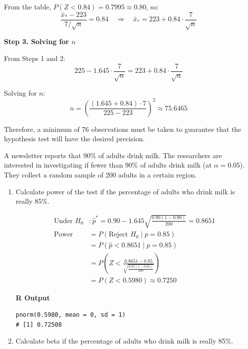 \begin{example}
From the table, $P(Z < 0.84) = 0.7995 \approx 0.80$, so:
\[
\frac{\bar{x}_* - 223}{7 / \sqrt{n}} = 0.84
\quad \Rightarrow \quad
\bar{x}_* = 223 + 0.84 \cdot \frac{7}{\sqrt{n}}
\]

\vspace{1em}
\textbf{Step 3. Solving for $n$}

From Steps 1 and 2:
\[
225 - 1.645 \cdot \frac{7}{\sqrt{n}} = 223 + 0.84 \cdot \frac{7}{\sqrt{n}}
\]

Solving for $n$:
\[
n = \left( \frac{(1.645 + 0.84) \cdot 7}{225 - 223} \right)^2 \approx 75.6465
\]

Therefore, a minimum of 76 observations must be taken to guarantee that the hypothesis test will have the desired precision.
\end{example}
\begin{example}

A newsletter reports that 90\% of adults drink milk. The researchers are interested in investigating if fewer than 90\% of adults drink milk (at $\alpha = 0.05$). They collect a random sample of 200 adults in a certain region.

\begin{enumerate}[label=\textbf{\alph*.}]
\item Calculate power of the test if the percentage of adults who drink milk is really 85\%.

\begin{align*}
\text{Under } H_0 &: \hat{p}^* = 0.90 - 1.645 \sqrt{\frac{0.90(1 - 0.90)}{200}} = 0.8651 \\
\text{Power} &= P(\text{Reject } H_0 \mid p = 0.85) \\
&= P(\hat{p} < 0.8651 \mid p = 0.85) \\
&= P\left(Z < \frac{0.8651 - 0.85}{\sqrt{\frac{0.85(1 - 0.85)}{200}}} \right) \\
&= P(Z < 0.5980) \approx 0.7250
\end{align*}

\noindent\textbf{R Output}
\begin{tcolorbox}[colback=gray!10, colframe=black!45, arc=2mm]
\begin{verbatim}
pnorm(0.5980, mean = 0, sd = 1)
# [1] 0.72508
\end{verbatim}
\end{tcolorbox}

\item Calculate beta if the percentage of adults who drink milk is really 85\%.


\end{enumerate}
\end{example}
